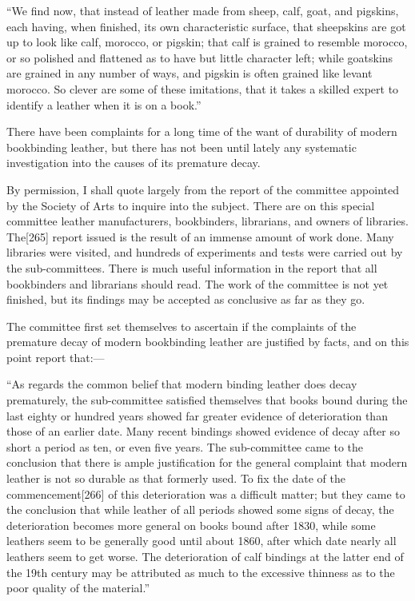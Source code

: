 \documentclass[
]{article}
\begin{document}
``We find now, that instead of leather made from sheep, calf, goat, and
pigskins, each having, when finished, its own characteristic surface,
that sheepskins are got up to look like calf, morocco, or pigskin; that
calf is grained to resemble morocco, or so polished and flattened as to
have but little character left; while goatskins are grained in any
number of ways, and pigskin is often grained like levant morocco. So
clever are some of these imitations, that it takes a skilled expert to
identify a leather when it is on a book.''

There have been complaints for a long time of the want of durability of
modern bookbinding leather, but there has not been until lately any
systematic investigation into the causes of its premature decay.

By permission, I shall quote largely from the report of the committee
appointed by the Society of Arts to inquire into the subject. There are
on this special committee leather manufacturers, bookbinders,
librarians, and owners of libraries.
The{\protect\hypertarget{Page_265}{}{{[}265{]}}} report issued is the
result of an immense amount of work done. Many libraries were visited,
and hundreds of experiments and tests were carried out by the
sub-committees. There is much useful information in the report that all
bookbinders and librarians should read. The work of the committee is not
yet finished, but its findings may be accepted as conclusive as far as
they go.

The committee first set themselves to ascertain if the complaints of the
premature decay of modern bookbinding leather are justified by facts,
and on this point report that:---

``As regards the common belief that modern binding leather does decay
prematurely, the sub-committee satisfied themselves that books bound
during the last eighty or hundred years showed far greater evidence of
deterioration than those of an earlier date. Many recent bindings showed
evidence of decay after so short a period as ten, or even five years.
The sub-committee came to the conclusion that there is ample
justification for the general complaint that modern leather is not so
durable as that formerly used. To fix the date of the
commencement{\protect\hypertarget{Page_266}{}{{[}266{]}}} of this
deterioration was a difficult matter; but they came to the conclusion
that while leather of all periods showed some signs of decay, the
deterioration becomes more general on books bound after 1830, while some
leathers seem to be generally good until about 1860, after which date
nearly all leathers seem to get worse. The deterioration of calf
bindings at the latter end of the 19th century may be attributed as much
to the excessive thinness as to the poor quality of the material.''
\end{document}
